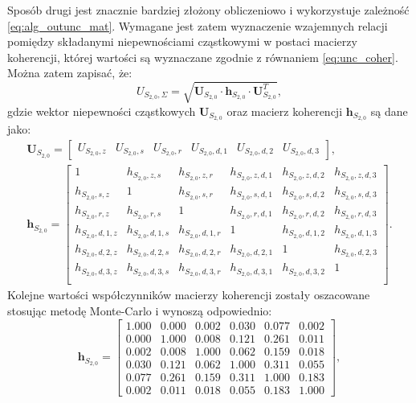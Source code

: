 Sposób drugi jest znacznie bardziej złożony obliczeniowo i wykorzystuje zależność \eqref{eq:alg_outunc_mat}. Wymagane jest zatem wyznaczenie wzajemnych relacji pomiędzy składanymi niepewnościami cząstkowymi w postaci macierzy koherencji, której wartości są wyznaczane zgodnie z równaniem \eqref{eq:unc_coher}. Można zatem zapisać, że:
\begin{equation}
U_{S_{2,0},\Sigma} = \sqrt{\mathbf{U}_{S_{2,0}} \cdot \mathbf{h}_{S_{2,0}} \cdot \mathbf{U}_{S_{2,0}}^{T}} \label{eq:sym_partd_output_unc_summul_S_2_0},
\end{equation}
gdzie wektor niepewności cząstkowych $\mathbf{U}_{S_{2,0}}$ oraz macierz koherencji $\mathbf{h}_{S_{2,0}}$ są dane jako:
\begin{gather}
\mathbf{U}_{S_{2,0}} =
\begin{bmatrix}
U_{S_{2,0},z} & U_{S_{2,0},s} & U_{S_{2,0},r} & U_{S_{2,0},d,1} & U_{S_{2,0},d,2} & U_{S_{2,0},d,3}
\end{bmatrix}
\label{eq:sym_partd_output_unc_sumuvect_S_2_0}, \\
\mathbf{h}_{S_{2,0}} =
\begin{bmatrix}
1                 & h_{S_{2,0},z,s}   & h_{S_{2,0},z,r}   & h_{S_{2,0},z,d,1} & h_{S_{2,0},z,d,2} & h_{S_{2,0},z,d,3} \\
h_{S_{2,0},s,z}   & 1                 & h_{S_{2,0},s,r}   & h_{S_{2,0},s,d,1} & h_{S_{2,0},s,d,2} & h_{S_{2,0},s,d,3} \\
h_{S_{2,0},r,z}   & h_{S_{2,0},r,s}   & 1                 & h_{S_{2,0},r,d,1} & h_{S_{2,0},r,d,2} & h_{S_{2,0},r,d,3} \\
h_{S_{2,0},d,1,z} & h_{S_{2,0},d,1,s} & h_{S_{2,0},d,1,r} & 1                 & h_{S_{2,0},d,1,2} & h_{S_{2,0},d,1,3} \\
h_{S_{2,0},d,2,z} & h_{S_{2,0},d,2,s} & h_{S_{2,0},d,2,r} & h_{S_{2,0},d,2,1} & 1                 & h_{S_{2,0},d,2,3} \\
h_{S_{2,0},d,3,z} & h_{S_{2,0},d,3,s} & h_{S_{2,0},d,3,r} & h_{S_{2,0},d,3,1} & h_{S_{2,0},d,3,2} & 1                 \\
\end{bmatrix}
\label{eq:sym_partd_output_unc_sumcoher_S_2_0}.
\end{gather}
Kolejne wartości współczynników macierzy koherencji zostały oszacowane stosując metodę Monte-Carlo i wynoszą odpowiednio:
\begin{equation}
\mathbf{h}_{S_{2,0}} =
\begin{bmatrix}
1.000 & 0.000 & 0.002 & 0.030 & 0.077 & 0.002 \\
0.000 & 1.000 & 0.008 & 0.121 & 0.261 & 0.011 \\
0.002 & 0.008 & 1.000 & 0.062 & 0.159 & 0.018 \\
0.030 & 0.121 & 0.062 & 1.000 & 0.311 & 0.055 \\
0.077 & 0.261 & 0.159 & 0.311 & 1.000 & 0.183 \\
0.002 & 0.011 & 0.018 & 0.055 & 0.183 & 1.000
\end{bmatrix}
\label{eq:sym_partd_output_unc_sumcoherval_S_2_0},
\end{equation}
